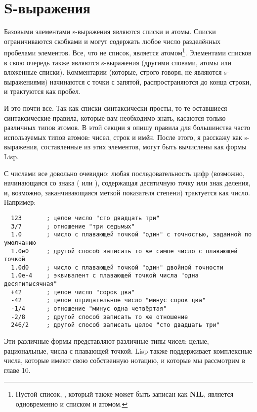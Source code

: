 \section{S-выражения}

Базовыми элементами s-выражения являются списки и атомы. Списки ограничиваются скобками и
могут содержать любое число разделённых пробелами элементов. Все, что не список, является
атомом\footnote{Пустой список, \code{()}, который также может быть записан как
  \textbf{NIL}, является одновременно и списком и атомом.}. Элементами списков в свою
очередь также являются s-выражения (другими словами, атомы или вложенные
списки). Комментарии (которые, строго говоря, не являются s-выражениями) начинаются с
точки с запятой, распространяются до конца строки, и трактуются как пробел.

И это почти все. Так как списки синтаксически просты, то те оставшиеся синтаксические
правила, которые вам необходимо знать, касаются только различных типов атомов. В этой
секции я опишу правила для большинства часто используемых типов атомов: чисел, строк и
имён. После этого, я расскажу как s-выражения, составленные из этих элементов, могут быть
вычислены как формы Lisp.

С числами все довольно очевидно: любая последовательность цифр (возможно, начинающаяся со
знака (\code{+} или \code{-}), содержащая десятичную точку или знак деления, и, возможно,
заканчивающаяся меткой показателя степени) трактуется как число. Например:

\begin{verbatim}
  123       ; целое число "сто двадцать три"
  3/7       ; отношение "три седьмых"
  1.0       ; число с плавающей точкой "один" с точностью, заданной по умолчанию
  1.0e0     ; другой способ записать то же самое число с плавающей точкой
  1.0d0     ; число с плавающей точкой "один" двойной точности
  1.0e-4    ; эквивалент с плавающей точкой числа "одна десятитысячная"
  +42       ; целое число "сорок два"
  -42       ; целое отрицательное число "минус сорок два"
  -1/4      ; отношение "минус одна четвёртая"
  -2/8      ; другой способ записать то же отношение
  246/2     ; другой способ записать целое "сто двадцать три"
\end{verbatim}

Эти различные формы представляют различные типы чисел: целые, рациональные, числа с
плавающей точкой. Lisp также поддерживает комплексные числа, которые имеют свою
собственную нотацию, и которые мы рассмотрим в главе 10.


